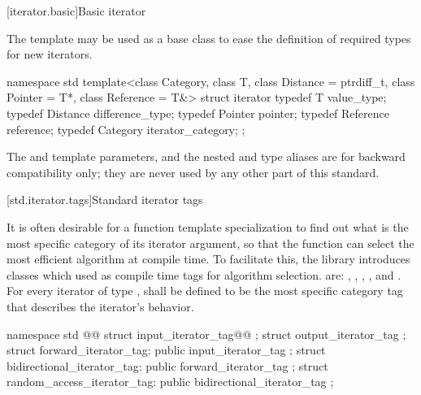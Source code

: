 [iterator.basic]{Basic iterator}

\pnum
The
template may be used as a base class to ease the definition of required types
for new iterators.

\begin{codeblock}
namespace std {
  template<class Category, class T, class Distance = ptrdiff_t,
    class Pointer = T*, class Reference = T&>
  struct iterator {
    typedef T         value_type;
    typedef Distance  difference_type;
    typedef Pointer   pointer;
    typedef Reference reference;
    typedef Category  iterator_category;
  };
}
\end{codeblock}

\begin{addedblock}
\pnum
\enternote The  and  template parameters, and the nested 
and  type aliases are for backward compatibility only; they are never used by any
other part of this standard.\exitnote
\end{addedblock}

[std.iterator.tags]{Standard iterator tags}

\pnum
{}%
%
%
%
%
%
It is often desirable for a
function template specialization
to find out what is the most specific category of its iterator
argument, so that the function can select the most efficient algorithm at compile time.
To facilitate this, the
library introduces
classes which  used as compile time tags for algorithm selection.
 are:
,
,
,
,
and
.
For every iterator of type
,
shall be defined to be the most specific category tag that describes the
iterator's behavior.

\begin{codeblock}
namespace std {
  @@
  struct input_iterator_tag@@ { };
  struct output_iterator_tag { };
  struct forward_iterator_tag: public input_iterator_tag { };
  struct bidirectional_iterator_tag: public forward_iterator_tag { };
  struct random_access_iterator_tag: public bidirectional_iterator_tag { };
}
\end{codeblock}

